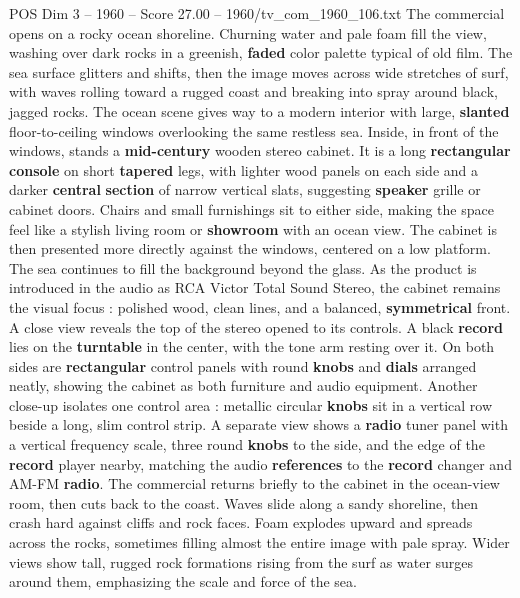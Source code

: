 \begin{textsample}{POS Dim 3 – 1960 – Score 27.00 – 1960/tv\_com\_1960\_106.txt}  \label{ex:f3_pos_022}
The commercial opens on a rocky ocean shoreline.
Churning water and pale foam fill the view, washing over dark rocks in a greenish, \textbf{faded} color palette typical of old film.
The sea surface glitters and shifts, then the image moves across wide stretches of surf, with waves rolling toward a rugged coast and breaking into spray around black, jagged rocks.
The ocean scene gives way to a modern interior with large, \textbf{slanted} floor-to-ceiling windows overlooking the same restless sea.
Inside, in front of the windows, stands a \textbf{mid-century} wooden stereo cabinet.
It is a long \textbf{rectangular} \textbf{console} on short \textbf{tapered} legs, with lighter wood panels on each side and a darker \textbf{central} \textbf{section} of narrow vertical slats, suggesting \textbf{speaker} grille or cabinet doors.
Chairs and small furnishings sit to either side, making the space feel like a stylish living room or \textbf{showroom} with an ocean view.
The cabinet is then presented more directly against the windows, centered on a low platform.
The sea continues to fill the background beyond the glass.
As the product is introduced in the audio as RCA Victor Total Sound Stereo, the cabinet remains the visual focus : polished wood, clean lines, and a balanced, \textbf{symmetrical} front.
A close view reveals the top of the stereo opened to its controls.
A black \textbf{record} lies on the \textbf{turntable} in the center, with the tone arm resting over it.
On both sides are \textbf{rectangular} control panels with round \textbf{knobs} and \textbf{dials} arranged neatly, showing the cabinet as both furniture and audio equipment.
Another close-up isolates one control area : metallic circular \textbf{knobs} sit in a vertical row beside a long, slim control strip.
A separate view shows a \textbf{radio} tuner panel with a vertical frequency scale, three round \textbf{knobs} to the side, and the edge of the \textbf{record} player nearby, matching the audio \textbf{references} to the \textbf{record} changer and AM-FM \textbf{radio}.
The commercial returns briefly to the cabinet in the ocean-view room, then cuts back to the coast.
Waves slide along a sandy shoreline, then crash hard against cliffs and rock faces.
Foam explodes upward and spreads across the rocks, sometimes filling almost the entire image with pale spray.
Wider views show tall, rugged rock formations rising from the surf as water surges around them, emphasizing the scale and force of the sea.

\end{textsample}
